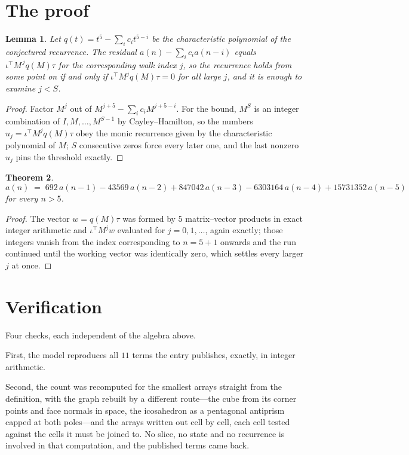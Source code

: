 \documentclass[11pt,a4paper]{article}
\theoremstyle{plain}
\newtheorem{theorem}{Theorem}
\newtheorem{lemma}[theorem]{Lemma}
\theoremstyle{definition}
\begin{document}
\section{The proof}

\begin{lemma}\label{lem:crit}
Let $q(t)=t^{5}-\sum_i c_it^{5-i}$ be the characteristic polynomial of the
conjectured recurrence. The residual $a(n)-\sum_ic_ia(n-i)$ equals
$\iota^{\!\top}M^{\,j}q(M)\tau$ for the corresponding walk index $j$, so the recurrence
holds from some point on if and only if $\iota^{\!\top}M^{j}q(M)\tau=0$ for all large $j$,
and it is enough to examine $j<S$.
\end{lemma}

\begin{proof}
Factor $M^{j}$ out of $M^{j+5}-\sum_ic_iM^{j+5-i}$. For the bound, $M^{S}$
is an integer combination of $I,M,\dots,M^{S-1}$ by Cayley--Hamilton, so the numbers
$u_j=\iota^{\!\top}M^{j}q(M)\tau$ obey the monic recurrence given by the characteristic
polynomial of $M$; $S$ consecutive zeros force every later one, and the last nonzero $u_j$
pins the threshold exactly.
\end{proof}

\begin{theorem}
\[
a(n)\;=\;692\,a(n-1) - 43569\,a(n-2) + 847042\,a(n-3) - 6303164\,a(n-4) + 15731352\,a(n-5)
\]
for every $n>5$.
\end{theorem}

\begin{proof}
The vector $w=q(M)\tau$ was formed by $5$ matrix--vector products in exact integer
arithmetic and $\iota^{\!\top}M^{j}w$ evaluated for $j=0,1,\dots$, again exactly; those
integers vanish from the index corresponding to $n=5+1$ onwards and the run continued
until the working vector was identically zero, which settles every larger $j$ at once.
\end{proof}

\section{Verification}

Four checks, each independent of the algebra above.

First, the model reproduces all $11$ terms the entry publishes, exactly, in integer
arithmetic.

Second, the count was recomputed for the smallest arrays straight from the definition, with the
graph rebuilt by a different route---the cube from its corner points and face normals in space,
the icosahedron as a pentagonal antiprism capped at both poles---and the arrays written out cell
by cell, each cell tested against the cells it must be joined to. No slice, no state and no
recurrence is involved in that computation, and the published terms came back.
\end{document}
